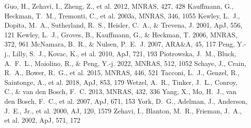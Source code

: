 \documentclass[twocolumn]{aastex631}
\begin{document}
\begin{thebibliography}{}
 Guo, H., Zehavi, I., Zheng, Z., et al. 2012, MNRAS, 427, 428
 Kauffmann, G., Heckman, T.~M., Tremonti, C., et al. 2003a, MNRAS, 346, 1055
 Kewley, L.~J., Dopita, M.~A., Sutherland, R.~S., Heisler, C.~A., \& Trevena, J. 2001, ApJ, 556, 121
 Kewley, L.~J., Groves, B., Kauffmann, G., \& Heckman, T. 2006, MNRAS, 372, 961
 McNamara, B.~R., \& Nulsen, P.~E.~J. 2007, ARA\&A, 45, 117
 Peng, Y.-j., Lilly, S.~J., Kovac, K., et al. 2010, ApJ, 721, 193
 Piotrowska, J.~M., Bluck, A.~F.~L., Maiolino, R., \& Peng, Y.-j. 2022, MNRAS, 512, 1052
 Schaye, J., Crain, R.~A., Bower, R.~G., et al. 2015, MNRAS, 446, 521
 Tacconi, L.~J., Genzel, R., Saintonge, A., et al. 2018, ApJ, 853, 179
 Wetzel, A.~R., Tinker, J.~L., Conroy, C., \& van den Bosch, F.~C. 2013, MNRAS, 432, 336
 Yang, X., Mo, H.~J., van den Bosch, F.~C., et al. 2007, ApJ, 671, 153
 York, D.~G., Adelman, J., Anderson, J.~E., Jr., et al. 2000, AJ, 120, 1579
 Zehavi, I., Blanton, M.~R., Frieman, J.~A., et al. 2002, ApJ, 571, 172
\end{thebibliography}
\end{document}
